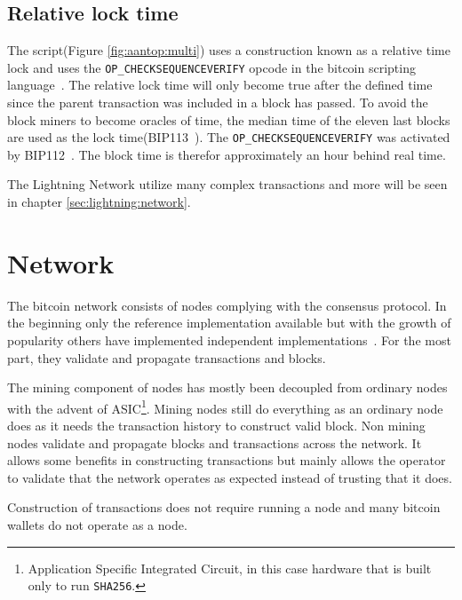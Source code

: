 \subsection{Relative lock time}
\label{sec:rlt}

The script(Figure \ref{fig:aantop:multi}) uses a construction known as a relative time lock and uses the \texttt{OP\_CHECKSEQUENCEVERIFY} opcode in the bitcoin scripting language~\cite{bip:0068:sequence:lock:time}. The relative lock time will only become true after the defined time since the parent transaction was included in a block has passed. To avoid the block \gls{miner}s to become oracles of time, the median time of the eleven last blocks are used as the lock time(BIP113~\cite{bip:0113:median:time:passed}). The \texttt{OP\_CHECKSEQUENCEVERIFY} was activated by BIP112~\cite{bip:0112:sequence:lock:time:soft:fork}. The block time is therefor approximately an hour behind real time.

The Lightning Network utilize many complex transactions and more will be seen in chapter \ref{sec:lightning:network}.

\section{Network}

The \gls{bitcoin} network consists of \gls{node}s complying with the consensus protocol. In the beginning only the reference implementation available but with the growth of popularity others have implemented independent implementations~\cite{repository:bitcoin, repository:btcd, repository:neutrino}. For the most part,  they validate and propagate transactions and blocks.

The mining component of nodes has mostly been decoupled from ordinary nodes with the advent of ASIC\footnote{Application Specific Integrated Circuit, in this case hardware that is built only to run \texttt{SHA256}.}. Mining nodes still do everything as an ordinary node does as it needs the transaction history to construct valid block. Non mining nodes validate and propagate blocks and transactions across the network. It allows some benefits in constructing transactions but mainly allows the operator to validate that the network operates as expected instead of trusting that it does.

Construction of transactions does not require running a node and many bitcoin wallets do not operate as a \gls{node}.
